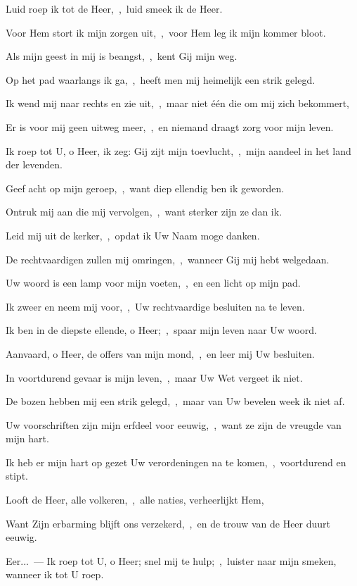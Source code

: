 \documentclass[12pt,twoside,a5paper]{article}
\begin{document}
\begin{halfparskip}
   Luid roep ik tot de Heer,~\sep\ luid smeek ik de Heer.

  Voor Hem stort ik mijn zorgen uit,~\sep\ voor Hem leg ik mijn kommer bloot.

  Als mijn geest in mij is beangst,~\sep\ kent Gij mijn weg.

  Op het pad waarlangs ik ga,~\sep\ heeft men mij heimelijk een strik gelegd.

  Ik wend mij naar rechts en zie uit,~\sep\ maar niet één die om mij zich bekommert,

  Er is voor mij geen uitweg meer,~\sep\ en niemand draagt zorg voor mijn leven.

  Ik roep tot U, o Heer, ik zeg: Gij zijt mijn toevlucht,~\sep\ mijn aandeel in het land der levenden.

  Geef acht op mijn geroep,~\sep\ want diep ellendig ben ik geworden.

  Ontruk mij aan die mij vervolgen,~\sep\ want sterker zijn ze dan ik.

  Leid mij uit de kerker,~\sep\ opdat ik Uw Naam moge danken.

  De rechtvaardigen zullen mij omringen,~\sep\ wanneer Gij mij hebt welgedaan.
\end{halfparskip}

\begin{halfparskip}
   Uw woord is een lamp voor mijn voeten,~\sep\ en een licht op mijn pad.

  Ik zweer en neem mij voor,~\sep\ Uw rechtvaardige besluiten na te leven.

  Ik ben in de diepste ellende, o Heer;~\sep\ spaar mijn leven naar Uw woord.

  Aanvaard, o Heer, de offers van mijn mond,~\sep\ en leer mij Uw besluiten.

  In voortdurend gevaar is mijn leven,~\sep\ maar Uw Wet vergeet ik niet.

  De bozen hebben mij een strik gelegd,~\sep\ maar van Uw bevelen week ik niet af.

  Uw voorschriften zijn mijn erfdeel voor eeuwig,~\sep\ want ze zijn de vreugde van mijn hart.

  Ik heb er mijn hart op gezet Uw verordeningen na te komen,~\sep\ voortdurend en stipt.
\end{halfparskip}

\begin{halfparskip}
   Looft de Heer, alle volkeren,~\sep\ alle naties, verheerlijkt Hem,

  Want Zijn erbarming blijft ons verzekerd,~\sep\ en de trouw van de Heer duurt eeuwig.

  Eer...~--- Ik roep tot U, o Heer; snel mij te hulp;~\sep\ luister naar mijn smeken, wanneer ik tot U roep.
\end{halfparskip}
\end{document}
